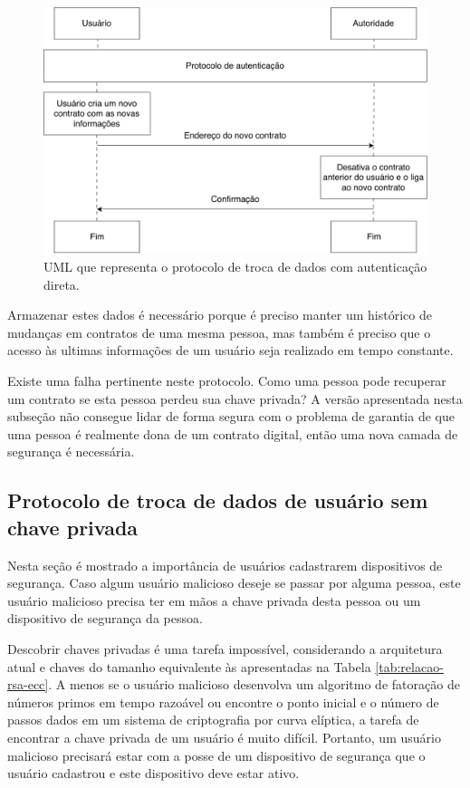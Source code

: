 \documentclass[tcc,capa]{texufpel}
\begin{document}
        \begin{figure}
            \centering
            \includegraphics[width=15cm]{imagens/protocolo-troca-com-chave.pdf}
            \caption{UML que representa o protocolo de troca de dados com autenticação direta.}
            \label{fig:protocolo-troca-com-chave}
        \end{figure}
        
        Armazenar estes dados é necessário porque é preciso manter um histórico de mudanças em contratos de uma mesma pessoa, mas também é preciso que o acesso às ultimas informações de um usuário seja realizado em tempo constante.
        
        Existe uma falha pertinente neste protocolo. Como uma pessoa pode recuperar um contrato se esta pessoa perdeu sua chave privada? A versão apresentada nesta subseção não consegue lidar de forma segura com o problema de garantia de que uma pessoa é realmente dona de um contrato digital, então uma nova camada de segurança é necessária.
        
    \subsection{Protocolo de troca de dados de usuário sem chave privada}
    
        Nesta seção é mostrado a importância de usuários cadastrarem dispositivos de segurança. Caso algum usuário malicioso deseje se passar por alguma pessoa, este usuário malicioso precisa ter em mãos a chave privada desta pessoa ou um dispositivo de segurança da pessoa.
        
        Descobrir chaves privadas é uma tarefa impossível, considerando a arquitetura atual e chaves do tamanho equivalente às apresentadas na Tabela \ref{tab:relacao-rsa-ecc}. A menos se o usuário malicioso desenvolva um algoritmo de fatoração de números primos em tempo razoável ou encontre o ponto inicial e o número de passos dados em um sistema de criptografia por curva elíptica, a tarefa de encontrar a chave privada de um usuário é muito difícil. Portanto, um usuário malicioso precisará estar com a posse de um dispositivo de segurança que o usuário cadastrou e este dispositivo deve estar ativo.
        
\end{document}
